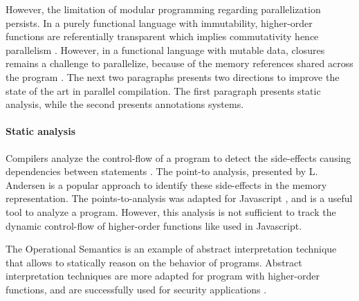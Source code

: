 However, the limitation of modular programming regarding parallelization persists.
In a purely functional language with immutability, higher-order functions are referentially transparent which implies commutativity hence parallelism .
However, in a functional language with mutable data, closures remains a challenge to parallelize, because of the memory references shared across the program \cite{Harrison1989, Nicolay2010, Matsakis2012a}.
The next two paragraphs presents two directions to improve the state of the art in parallel compilation.
The first paragraph presents static analysis, while the second presents annotations systems.




\paragraph{Static analysis}


Compilers analyze the control-flow of a program to detect the side-effects causing dependencies between statements \cite{Allen1970}.
The point-to analysis, presented by L. Andersen \cite{Andersen1994} is a popular approach to identify these side-effects in the memory representation.
The points-to-analysis was adapted for Javascript \cite{Jang2009,Sridharan2012,Wei2014}, and is a useful tool to analyze a program.
However, this analysis is not sufficient to track the dynamic control-flow of higher-order functions \cite{Shivers1991} like used in Javascript.

The Operational Semantics is an example of abstract interpretation technique that allows to statically reason on the behavior of programs\cite{Maffeis2008,Smith2011,Gardner2012,Gardner2013,Bodin2014}.
Abstract interpretation techniques are more adapted for program with higher-order functions, and are successfully used for security applications \cite{Huang2004,Jovanovic2006,Yu2007,Maffeis2009a,Chudnov2015,Dolby2015}.

